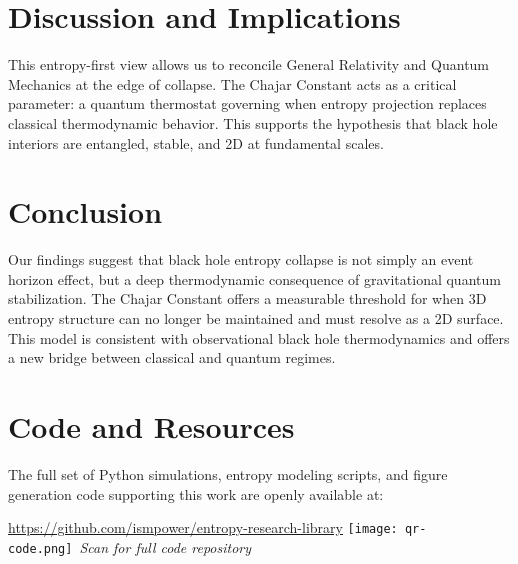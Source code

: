 \documentclass[12pt]{article}
\begin{document}
\section{Discussion and Implications}
This entropy-first view allows us to reconcile General Relativity and Quantum Mechanics at the edge of collapse. The Chajar Constant acts as a critical parameter: a quantum thermostat governing when entropy projection replaces classical thermodynamic behavior. This supports the hypothesis that black hole interiors are entangled, stable, and 2D at fundamental scales.

\section{Conclusion}
Our findings suggest that black hole entropy collapse is not simply an event horizon effect, but a deep thermodynamic consequence of gravitational quantum stabilization. The Chajar Constant offers a measurable threshold for when 3D entropy structure can no longer be maintained and must resolve as a 2D surface. This model is consistent with observational black hole thermodynamics and offers a new bridge between classical and quantum regimes.

\section*{Code and Resources}
The full set of Python simulations, entropy modeling scripts, and figure generation code supporting this work are openly available at:
\begin{center}
\url{https://github.com/ismpower/entropy-research-library}
\texttt{[image: qr-code.png]}\
\textit{Scan for full code repository}\
\end{center}
\end{document}

